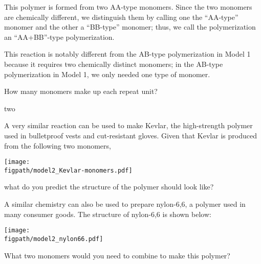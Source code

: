 \begin{activity}
\begin{ctqs}
				\begin{solution}[1.25in]
					This polymer is formed from two AA-type monomers.  Since the two monomers are chemically different, we distinguish them by calling one the ``AA-type'' monomer and the other a ``BB-type'' monomer; thus, we call the polymerization an ``AA+BB''-type polymerization.
					
					This reaction is notably different from the AB-type polymerization in Model 1 because it requires two chemically distinct monomers; in the AB-type polymerization in Model 1, we only needed one type of monomer.
				\end{solution}
		
		\question How many monomers make up each repeat unit?
			
				\begin{solution}[0.5in]
					two
				\end{solution}
		
		\question A very similar reaction can be used to make Kevlar, the high-strength polymer used in bulletproof vests and cut-resistant gloves.  Given that Kevlar is produced from the following two monomers,
		
	
	\centerline{\texttt{[image: \\figpath/model2\_Kevlar-monomers.pdf]}}
		
		what do you predict the structure of the polymer should look like?
			
				\begin{solution}[1.5in]
				\end{solution}
		
		\question A similar chemistry can also be used to prepare nylon-6,6, a polymer used in many consumer goods.
		The structure of nylon-6,6 is shown below:
		
			\centerline{\texttt{[image: \\figpath/model2\_nylon66.pdf]}}
			
		What two monomers would you need to combine to make this polymer?
			
				\begin{solution}[2in]
				\end{solution}
			
\end{ctqs}
	
\begin{infobox}


\end{infobox}
\end{activity}
